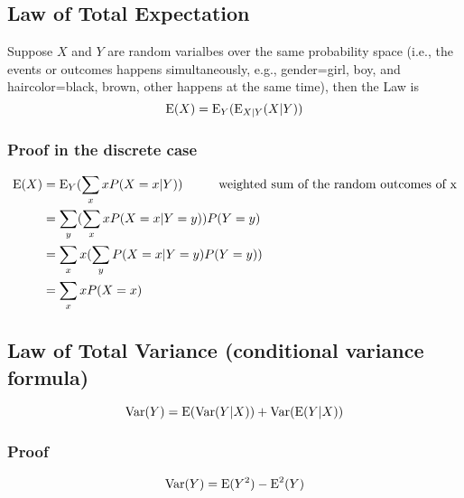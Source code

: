 \documentclass[12pt]{article}
\newcommand{\Var}{{\bf\text{Var}}}
\newcommand{\Exp}{{\bf\text{E}}}
\begin{document}
\subsection{Law of Total Expectation}
Suppose $X$ and $Y$ are random varialbes over the same probability space (i.e., the events or outcomes happens simultaneously, e.g., gender={girl, boy}, and haircolor={black, brown, other} happens at the same time), then the Law is
\begin{equation}
   \Exp(X)= \Exp_Y(\Exp_{X|Y}(X|Y))
\end{equation}
\subsubsection{Proof in the discrete case}
\begin{equation}
\begin{aligned}
   \Exp(X) & = \Exp_Y(\sum\limits_x x P(X=x|Y)) \hspace{1cm} \text{weighted sum of the random outcomes of x}\\
         & = \sum\limits_y (\sum\limits_x xP(X=x|Y=y)) P(Y=y) \\
         & = \sum\limits_x x (\sum\limits_y P(X=x|Y=y)P(Y=y)) \\
         & = \sum\limits_x x P(X=x) 
\end{aligned}
\end{equation}


\subsection{Law of Total Variance (conditional variance formula)}
\begin{equation}
   \Var(Y)= \Exp(\Var(Y|X)) + \Var(\Exp(Y|X))
\end{equation}

\subsubsection{Proof}
\begin{equation}
   \Var(Y)= \Exp(Y^2)- \Exp^2(Y)
\end{equation}
\end{document}
